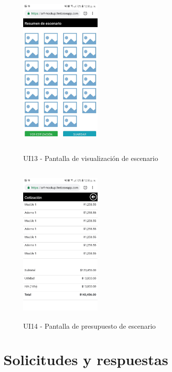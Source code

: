 \begin{figure}[h!]
	\begin{minipage}{0.48\textwidth}
		\centering
		\includegraphics[width=4cm,height=8cm]{imagenes/Anexos/Mockup/escenario.jpg}
		\caption{UI13 - Pantalla de visualización de escenario}
		\label{fig:viewesc}
	\end{minipage}\hfill
	\begin{minipage}{0.48\textwidth}
		\centering
		\includegraphics[width=4cm,height=8cm]{imagenes/Anexos/Mockup/presupuesto.jpg}
		\caption{UI14 - Pantalla de presupuesto de escenario}
		\label{fig:presupuesto} 
	\end{minipage}\hfill
\end{figure}


\section{Solicitudes y respuestas}